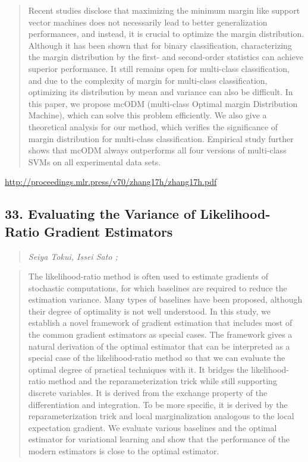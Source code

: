 \documentclass{article}
\begin{document}
\begin{quote}
    Recent studies disclose that maximizing the minimum margin like support vector machines does not necessarily lead to better generalization performances, and instead, it is crucial to optimize the margin distribution. Although it has been shown that for binary classification, characterizing the margin distribution by the first- and second-order statistics can achieve superior performance. It still remains open for multi-class classification, and due to the complexity of margin for multi-class classification, optimizing its distribution by mean and variance can also be difficult. In this paper, we propose mcODM (multi-class Optimal margin Distribution Machine), which can solve this problem efficiently. We also give a theoretical analysis for our method, which verifies the significance of margin distribution for multi-class classification. Empirical study further shows that mcODM always outperforms all four versions of multi-class SVMs on all experimental data sets.  \end{quote}

\href{http://proceedings.mlr.press/v70/zhang17h/zhang17h.pdf}{http://proceedings.mlr.press/v70/zhang17h/zhang17h.pdf}

\subsection{33. Evaluating the Variance of Likelihood-Ratio Gradient Estimators}

\begin{quote}
\footnotesize{\textit{Seiya Tokui, Issei Sato ;}}
\end{quote}

\begin{quote}
    The likelihood-ratio method is often used to estimate gradients of stochastic computations, for which baselines are required to reduce the estimation variance. Many types of baselines have been proposed, although their degree of optimality is not well understood. In this study, we establish a novel framework of gradient estimation that includes most of the common gradient estimators as special cases. The framework gives a natural derivation of the optimal estimator that can be interpreted as a special case of the likelihood-ratio method so that we can evaluate the optimal degree of practical techniques with it. It bridges the likelihood-ratio method and the reparameterization trick while still supporting discrete variables. It is derived from the exchange property of the differentiation and integration. To be more specific, it is derived by the reparameterization trick and local marginalization analogous to the local expectation gradient. We evaluate various baselines and the optimal estimator for variational learning and show that the performance of the modern estimators is close to the optimal estimator.  \end{quote}
\end{document}

